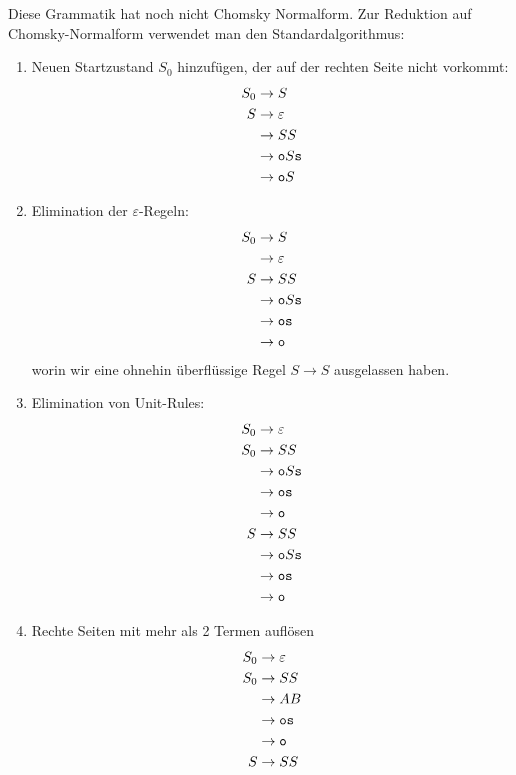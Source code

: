 \begin{loesung}
Diese Grammatik hat noch nicht Chomsky Normalform. Zur Reduktion auf
Chomsky-Normalform verwendet man den Standardalgorithmus:
\begin{enumerate}
\item Neuen Startzustand $S_0$ hinzufügen, der auf der rechten Seite
nicht vorkommt:
\begin{align*}
S_0&\rightarrow S\\
S&\rightarrow \varepsilon\\
 &\rightarrow SS\\
 &\rightarrow {\tt o}S{\tt s}\\
 &\rightarrow {\tt o}S
\end{align*}
\item Elimination der $\varepsilon$-Regeln:
\begin{align*}
S_0&\rightarrow S\\
   &\rightarrow \varepsilon\\
S&\rightarrow SS\\
 &\rightarrow {\tt o}S{\tt s}\\
 &\rightarrow {\tt o}{\tt s}\\
 &\rightarrow {\tt o}
\end{align*}
worin wir eine ohnehin überflüssige Regel $S\rightarrow S$
ausgelassen haben.
\item Elimination von Unit-Rules:
\begin{align*}
S_0&\rightarrow \varepsilon\\
S_0&\rightarrow SS\\
   &\rightarrow {\tt o}S{\tt s}\\
   &\rightarrow {\tt o}{\tt s}\\
   &\rightarrow {\tt o}\\
S&\rightarrow SS\\
 &\rightarrow {\tt o}S{\tt s}\\
 &\rightarrow {\tt o}{\tt s}\\
 &\rightarrow {\tt o}
\end{align*}
\item Rechte Seiten mit mehr als 2 Termen auflösen
\begin{align*}
S_0&\rightarrow \varepsilon\\
S_0&\rightarrow SS\\
   &\rightarrow AB\\
   &\rightarrow {\tt o}{\tt s}\\
   &\rightarrow {\tt o}\\
S&\rightarrow SS\\

\end{align*}
\end{enumerate}
\end{loesung}
